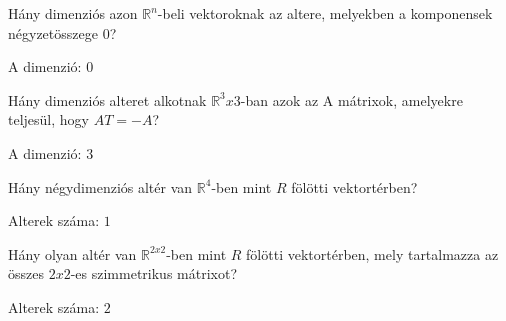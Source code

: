\begin{frame}
  \begin{tcolorbox}[title={4/4. -R-}]
      Hány dimenziós azon $\mathbb{R}^n$-beli vektoroknak az altere, melyekben a komponensek négyzetösszege $0$?
  \tcblower

    \mmedskip 
    
    A dimenzió: $0$
  \end{tcolorbox}
\end{frame}


\begin{frame}
  \begin{tcolorbox}[title={4/5. -Q-}]
      Hány dimenziós alteret alkotnak $\mathbb{R}^3x3$-ban azok az A mátrixok, amelyekre teljesül, hogy $AT = -A$?
  \tcblower

    \mmedskip 
    
    A dimenzió: $3$
  \end{tcolorbox}
\end{frame}


\begin{frame}
  \begin{tcolorbox}[title={4/6. -R-}]
      Hány négydimenziós altér van $\mathbb{R}^4$-ben mint $R$ fölötti vektortérben?
  \tcblower

    \mmedskip 
    
    Alterek száma: $1$
  \end{tcolorbox}
\end{frame}


\begin{frame}
  \begin{tcolorbox}[title={4/7. -Q-}]
      Hány olyan altér van $\mathbb{R}^{2 x 2}$-ben mint $R$ fölötti vektortérben, mely tartalmazza az összes $2 x 2$-es szimmetrikus mátrixot?
  \tcblower

    \mmedskip 
    
    Alterek száma: $2$
  \end{tcolorbox}
\end{frame}


